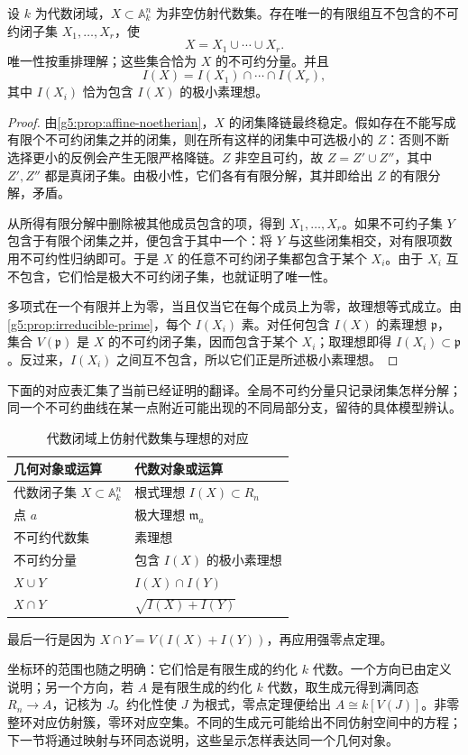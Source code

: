 \begin{theorem}\label{g5:thm:irreducible-components}
	设 \(k\) 为代数闭域，\(X\subset\mathbb A_k^n\) 为非空仿射代数集。存在唯一的有限组互不包含的不可约闭子集 \(X_1,\ldots,X_r\)，使
	\[
		X=X_1\cup\cdots\cup X_r.
	\]
	唯一性按重排理解；这些集合恰为 \(X\) 的不可约分量。并且
	\[
		I(X)=I(X_1)\cap\cdots\cap I(X_r),
	\]
	其中 \(I(X_i)\) 恰为包含 \(I(X)\) 的极小素理想。
\end{theorem}
\begin{proof}
	由\cref{g5:prop:affine-noetherian}，\(X\) 的闭集降链最终稳定。假如存在不能写成有限个不可约闭集之并的闭集，则在所有这样的闭集中可选极小的 \(Z\)：否则不断选择更小的反例会产生无限严格降链。\(Z\) 非空且可约，故 \(Z=Z'\cup Z''\)，其中 \(Z',Z''\) 都是真闭子集。由极小性，它们各有有限分解，其并即给出 \(Z\) 的有限分解，矛盾。

	从所得有限分解中删除被其他成员包含的项，得到 \(X_1,\ldots,X_r\)。如果不可约子集 \(Y\) 包含于有限个闭集之并，便包含于其中一个：将 \(Y\) 与这些闭集相交，对有限项数用不可约性归纳即可。于是 \(X\) 的任意不可约闭子集都包含于某个 \(X_i\)。由于 \(X_i\) 互不包含，它们恰是极大不可约闭子集，也就证明了唯一性。

	多项式在一个有限并上为零，当且仅当它在每个成员上为零，故理想等式成立。由\cref{g5:prop:irreducible-prime}，每个 \(I(X_i)\) 素。对任何包含 \(I(X)\) 的素理想 \(\mathfrak p\)，集合 \(V(\mathfrak p)\) 是 \(X\) 的不可约闭子集，因而包含于某个 \(X_i\)；取理想即得 \(I(X_i)\subset\mathfrak p\)。反过来，\(I(X_i)\) 之间互不包含，所以它们正是所述极小素理想。
\end{proof}

下面的对应表汇集了当前已经证明的翻译。全局不可约分量只记录闭集怎样分解；同一个不可约曲线在某一点附近可能出现的不同局部分支，留待的具体模型辨认。
\begin{table}[htbp]
	\centering
	\caption{代数闭域上仿射代数集与理想的对应}
	\label{g5:tab:affine-dictionary}
	\begin{tabular}{ll}
		\toprule
		几何对象或运算 & 代数对象或运算 \\
		\midrule
		代数闭子集 \(X\subset\mathbb A_k^n\) & 根式理想 \(I(X)\subset R_n\) \\
		点 \(a\) & 极大理想 \(\mathfrak m_a\) \\
		不可约代数集 & 素理想 \\
		不可约分量 & 包含 \(I(X)\) 的极小素理想 \\
		\(X\cup Y\) & \(I(X)\cap I(Y)\) \\
		\(X\cap Y\) & \(\sqrt{I(X)+I(Y)}\) \\
		\bottomrule
	\end{tabular}
\end{table}
最后一行是因为 \(X\cap Y=V(I(X)+I(Y))\)，再应用强零点定理。

坐标环的范围也随之明确：它们恰是有限生成的约化 \(k\) 代数。一个方向已由定义说明；另一个方向，若 \(A\) 是有限生成的约化 \(k\) 代数，取生成元得到满同态 \(R_n\to A\)，记核为 \(J\)。约化性使 \(J\) 为根式，零点定理便给出 \(A\cong k[V(J)]\)。非零整环对应仿射簇，零环对应空集。不同的生成元可能给出不同仿射空间中的方程；下一节将通过映射与环同态说明，这些呈示怎样表达同一个几何对象。
